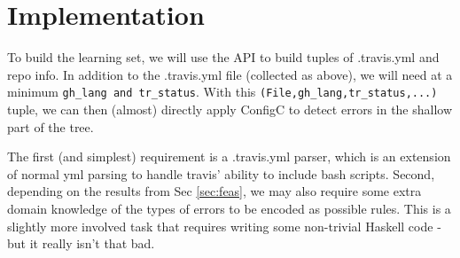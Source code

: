 \section{Implementation}

To build the learning set, we will use the API to build tuples of .travis.yml and repo info.
In addition to the .travis.yml file (collected as above), we will need at a minimum \verb|gh_lang and tr_status|.
With this \verb|(File,gh_lang,tr_status,...)| tuple, we can then (almost) directly apply ConfigC to detect errors in the shallow part of the tree.

The first (and simplest) requirement is a .travis.yml parser, which is an extension of normal yml parsing to handle travis' ability to include bash scripts.
Second, depending on the results from Sec \ref{sec:feas}, we may also require some extra domain knowledge of the types of errors to be encoded as possible rules.
This is a slightly more involved task that requires writing some non-trivial Haskell code - but it really isn't that bad.
